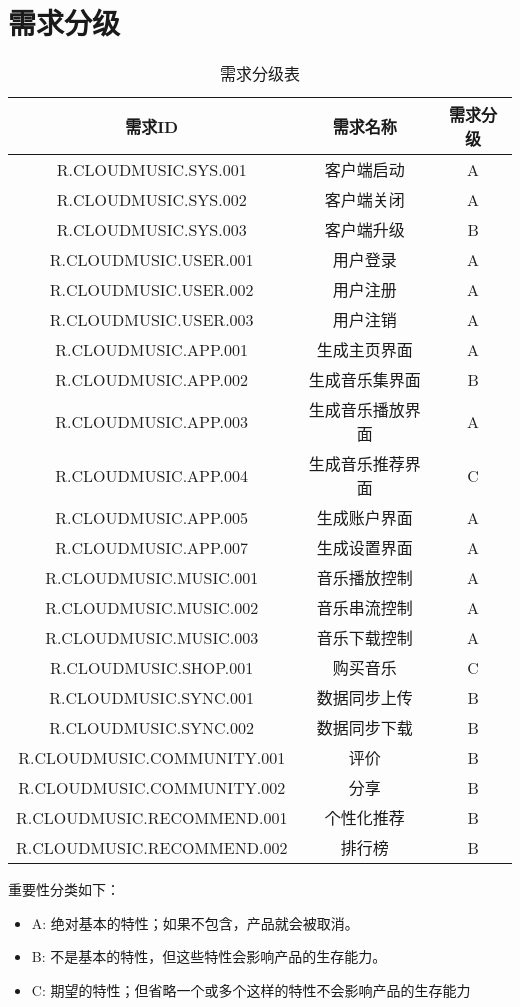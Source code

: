 \chapter{需求分级}
\begin{table}[htbp]
\centering
\caption{需求分级表} \label{tab:classification}
\begin{tabular}{|c|c|c|}
    \hline
    需求ID & 需求名称 & 需求分级 \\
    \hline
    R.CLOUDMUSIC.SYS.001 & 客户端启动 & A \\
    \hline
    R.CLOUDMUSIC.SYS.002 & 客户端关闭 & A \\
    \hline
    R.CLOUDMUSIC.SYS.003 & 客户端升级 & B \\
    \hline
    R.CLOUDMUSIC.USER.001 & 用户登录 & A \\
    \hline
    R.CLOUDMUSIC.USER.002 & 用户注册 & A \\
    \hline
    R.CLOUDMUSIC.USER.003 & 用户注销 & A \\
    \hline
    R.CLOUDMUSIC.APP.001 & 生成主页界面 & A \\
    \hline
    R.CLOUDMUSIC.APP.002 & 生成音乐集界面 & B \\
    \hline
    R.CLOUDMUSIC.APP.003 & 生成音乐播放界面 & A \\
    \hline
    R.CLOUDMUSIC.APP.004 & 生成音乐推荐界面 & C \\
    \hline
    R.CLOUDMUSIC.APP.005 & 生成账户界面 & A \\
    \hline
    R.CLOUDMUSIC.APP.007 & 生成设置界面 & A \\
    \hline
    R.CLOUDMUSIC.MUSIC.001 & 音乐播放控制 & A \\
    \hline
    R.CLOUDMUSIC.MUSIC.002 & 音乐串流控制 & A \\
    \hline
    R.CLOUDMUSIC.MUSIC.003 & 音乐下载控制 & A \\
    \hline
    R.CLOUDMUSIC.SHOP.001 & 购买音乐 & C \\
    \hline
    R.CLOUDMUSIC.SYNC.001 & 数据同步上传 & B \\
    \hline
    R.CLOUDMUSIC.SYNC.002 & 数据同步下载 & B \\
    \hline
    R.CLOUDMUSIC.COMMUNITY.001 & 评价 & B \\
    \hline
    R.CLOUDMUSIC.COMMUNITY.002 & 分享 & B \\
    \hline
    R.CLOUDMUSIC.RECOMMEND.001 & 个性化推荐 & B \\
    \hline
    R.CLOUDMUSIC.RECOMMEND.002 & 排行榜 & B \\
    \hline
\end{tabular}
\end{table}

重要性分类如下：
\begin{itemize}
\item A: 绝对基本的特性；如果不包含，产品就会被取消。
\item B: 不是基本的特性，但这些特性会影响产品的生存能力。
\item C: 期望的特性；但省略一个或多个这样的特性不会影响产品的生存能力
\end{itemize}
